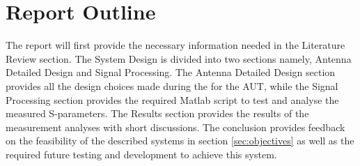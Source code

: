 \section{Report Outline}
The report will first provide the necessary information needed in the Literature Review section. The System Design is divided into two sections namely, Antenna Detailed Design and Signal Processing. The Antenna Detailed Design section provides all the design choices made during the for the AUT, while the Signal Processing section provides the required Matlab script to test and analyse the measured S-parameters. The Results section provides the results of the measurement analyses with short discussions. The conclusion provides feedback on the feasibility of the described systems in section \ref{sec:objectives} as well as the required future testing and development to achieve this system.



\ifstandalone

\printnoidxglossary[type=\acronymtype,nonumberlist]
\fi
%
